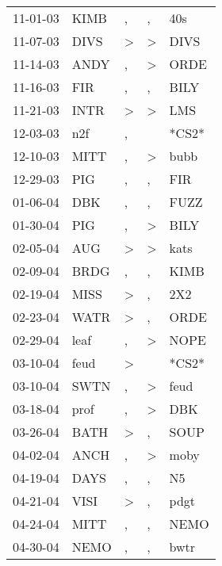 \begin{supertabular}{lllll}
 11-01-03 &   KIMB &                , &                , &    40s \\
 11-07-03 &   DIVS &     \textgreater &     \textgreater &   DIVS \\
 11-14-03 &   ANDY &                , &     \textgreater &   ORDE \\
 11-16-03 &    FIR &                , &                , &   BILY \\
 11-21-03 &   INTR &     \textgreater &     \textgreater &    LMS \\
 12-03-03 &    n2f &                , &                  &  *CS2* \\
 12-10-03 &   MITT &                , &     \textgreater &   bubb \\
 12-29-03 &    PIG &                , &                , &    FIR \\
 01-06-04 &    DBK &                , &                , &   FUZZ \\
 01-30-04 &    PIG &                , &     \textgreater &   BILY \\
 02-05-04 &    AUG &     \textgreater &     \textgreater &   kats \\
 02-09-04 &   BRDG &                , &                , &   KIMB \\
 02-19-04 &   MISS &     \textgreater &                , &    2X2 \\
 02-23-04 &   WATR &     \textgreater &                , &   ORDE \\
 02-29-04 &   leaf &                , &     \textgreater &   NOPE \\
 03-10-04 &   feud &     \textgreater &                  &  *CS2* \\
 03-10-04 &   SWTN &                , &     \textgreater &   feud \\
 03-18-04 &   prof &                , &     \textgreater &    DBK \\
 03-26-04 &   BATH &     \textgreater &                , &   SOUP \\
 04-02-04 &   ANCH &                , &     \textgreater &   moby \\
 04-19-04 &   DAYS &                , &                , &     N5 \\
 04-21-04 &   VISI &     \textgreater &                , &   pdgt \\
 04-24-04 &   MITT &                , &                , &   NEMO \\
 04-30-04 &   NEMO &                , &                , &   bwtr \\

\end{supertabular}
